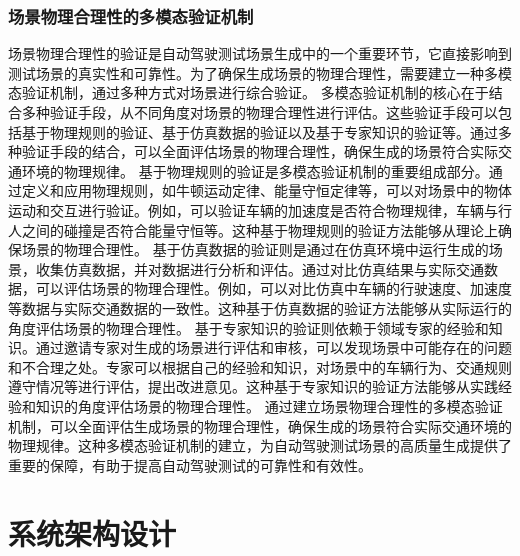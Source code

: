 \documentclass{article}
\begin{document}
\subsubsection{场景物理合理性的多模态验证机制}
场景物理合理性的验证是自动驾驶测试场景生成中的一个重要环节，它直接影响到测试场景的真实性和可靠性。为了确保生成场景的物理合理性，需要建立一种多模态验证机制，通过多种方式对场景进行综合验证。
多模态验证机制的核心在于结合多种验证手段，从不同角度对场景的物理合理性进行评估。这些验证手段可以包括基于物理规则的验证、基于仿真数据的验证以及基于专家知识的验证等。通过多种验证手段的结合，可以全面评估场景的物理合理性，确保生成的场景符合实际交通环境的物理规律。
基于物理规则的验证是多模态验证机制的重要组成部分。通过定义和应用物理规则，如牛顿运动定律、能量守恒定律等，可以对场景中的物体运动和交互进行验证。例如，可以验证车辆的加速度是否符合物理规律，车辆与行人之间的碰撞是否符合能量守恒等。这种基于物理规则的验证方法能够从理论上确保场景的物理合理性。
基于仿真数据的验证则是通过在仿真环境中运行生成的场景，收集仿真数据，并对数据进行分析和评估。通过对比仿真结果与实际交通数据，可以评估场景的物理合理性。例如，可以对比仿真中车辆的行驶速度、加速度等数据与实际交通数据的一致性。这种基于仿真数据的验证方法能够从实际运行的角度评估场景的物理合理性。
基于专家知识的验证则依赖于领域专家的经验和知识。通过邀请专家对生成的场景进行评估和审核，可以发现场景中可能存在的问题和不合理之处。专家可以根据自己的经验和知识，对场景中的车辆行为、交通规则遵守情况等进行评估，提出改进意见。这种基于专家知识的验证方法能够从实践经验和知识的角度评估场景的物理合理性。
通过建立场景物理合理性的多模态验证机制，可以全面评估生成场景的物理合理性，确保生成的场景符合实际交通环境的物理规律。这种多模态验证机制的建立，为自动驾驶测试场景的高质量生成提供了重要的保障，有助于提高自动驾驶测试的可靠性和有效性。





\section{系统架构设计}
\end{document}
